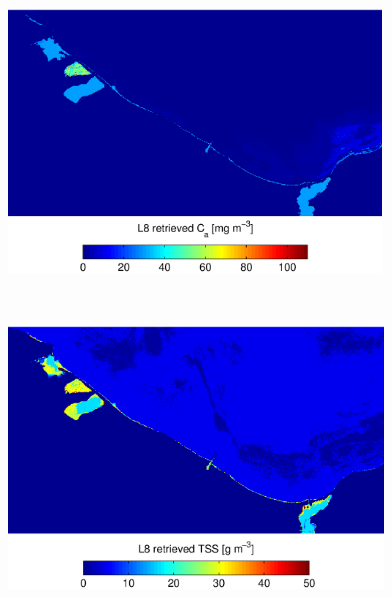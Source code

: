 \documentclass[onecolumn,3p,letterpaper]{elsarticle}
\begin{document}
\begin{figure}[htbp!]
  \begin{minipage}[c]{1.0\linewidth}
  		\centering
      \includegraphics[trim=0 0 0 30,clip,height=7cm]{./Images/CHLmap140929_150420}  
  \end{minipage}\\

  \begin{minipage}[c]{1.0\linewidth}
  		\centering
      \includegraphics[trim=0 0 0 30,clip,height=7cm]{./Images/TSSmap140929_150420}  
  \end{minipage}\\


\end{figure}
\end{document}
